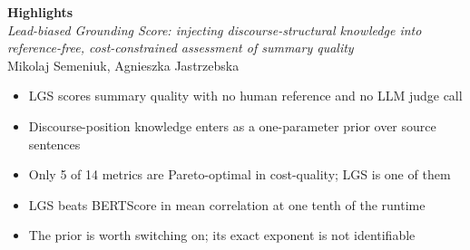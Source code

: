 \documentclass[11pt]{article}
\begin{document}
\begin{center}
{\large\bfseries Highlights}\\[2mm]
{\itshape Lead-biased Grounding Score: injecting discourse-structural
knowledge into reference-free, cost-constrained assessment of summary
quality}\\[1mm]
{\small Mikolaj Semeniuk, Agnieszka Jastrzebska}
\end{center}

\vspace{4mm}

\begin{itemize}[leftmargin=*, itemsep=2mm]
  \item LGS scores summary quality with no human reference and no LLM judge call
  \item Discourse-position knowledge enters as a one-parameter prior over source sentences
  \item Only 5 of 14 metrics are Pareto-optimal in cost-quality; LGS is one of them
  \item LGS beats BERTScore in mean correlation at one tenth of the runtime
  \item The prior is worth switching on; its exact exponent is not identifiable
\end{itemize}
\end{document}
